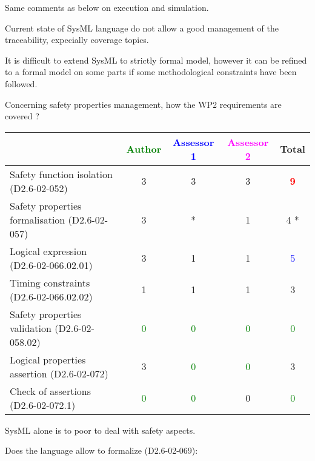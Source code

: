 \begin{assessor2}
Same comments as below on execution and simulation.

Current state of SysML language do not allow a good management of the traceability, expecially coverage topics.

It is difficult to extend SysML to strictly formal model, however it can be refined to a formal model on some parts if some methodological constraints have been followed.
\end{assessor2}

Concerning safety properties management, how the WP2 requirements are covered ?

\begin{tabular}{|l | c | c | c | c|}
\hline
& \textcolor{green}{Author} & \textcolor{blue}{Assessor 1} & \textcolor{magenta}{Assessor 2} & Total \\
\hline
Safety function isolation (D2.6-02-052) & 3     & 3     & 3     & \textcolor{red}{\textbf{9}} \\
\hline
Safety properties formalisation (D2.6-02-057) & 3     & * & 1     & 4    * \\
\hline
Logical expression (D2.6-02-066.02.01) & 3     & 1     & 1     & \textcolor{blue}{5} \\
\hline
Timing constraints (D2.6-02-066.02.02) & 1     & 1     & 1     & 3     \\
\hline
Safety properties validation (D2.6-02-058.02) & \textcolor{green}{0} & \textcolor{green}{0} & \textcolor{green}{0} & \textcolor{green}{0} \\
\hline
Logical properties assertion (D2.6-02-072) & 3     & \textcolor{green}{0} & \textcolor{green}{0} & 3     \\
\hline
Check of assertions (D2.6-02-072.1) & \textcolor{green}{0} & \textcolor{green}{0} &  0 & \textcolor{green}{0} \\
\hline
\end{tabular}




\begin{assessor2}
SysML alone is to  poor to deal with safety aspects.
\end{assessor2}


Does the language allow to formalize (D2.6-02-069):

